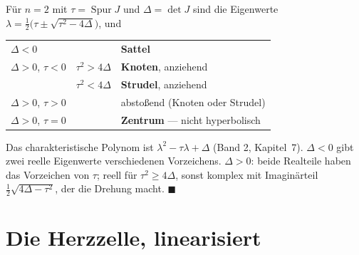 \begin{merksatz}
Für $n = 2$ mit $\tau = \operatorname{Spur} J$ und $\Delta = \det J$ sind die Eigenwerte $\lambda = \tfrac12\big(\tau\pm\sqrt{\tau^{2}-4\Delta}\big)$, und

\begin{center}
{\small
\renewcommand{\arraystretch}{1.5}
\begin{tabular}{@{}P{2.6cm}P{2.8cm}P{3.0cm}@{}}
\toprule
$\Delta < 0$ & & \textbf{Sattel}\\
$\Delta > 0$, $\tau < 0$ & $\tau^{2} > 4\Delta$ & \textbf{Knoten}, anziehend\\
& $\tau^{2} < 4\Delta$ & \textbf{Strudel}, anziehend\\
$\Delta > 0$, $\tau > 0$ & & abstoßend (Knoten oder Strudel)\\
$\Delta > 0$, $\tau = 0$ & & \textbf{Zentrum} --- nicht hyperbolisch\\
\bottomrule
\end{tabular}}
\end{center}

Das charakteristische Polynom ist $\lambda^{2} - \tau\lambda + \Delta$ (Band 2, Kapitel~7). $\Delta < 0$ gibt zwei reelle Eigenwerte verschiedenen Vorzeichens. $\Delta > 0$: beide Realteile haben das Vorzeichen von $\tau$; reell für $\tau^{2} \ge 4\Delta$, sonst komplex mit Imaginärteil $\tfrac12\sqrt{4\Delta-\tau^{2}}$, der die Drehung macht. $\blacksquare$

\begin{center}
\begin{minipage}{0.88\textwidth}
\end{minipage}
\end{center}
\end{merksatz}

\section{Die Herzzelle, linearisiert}

